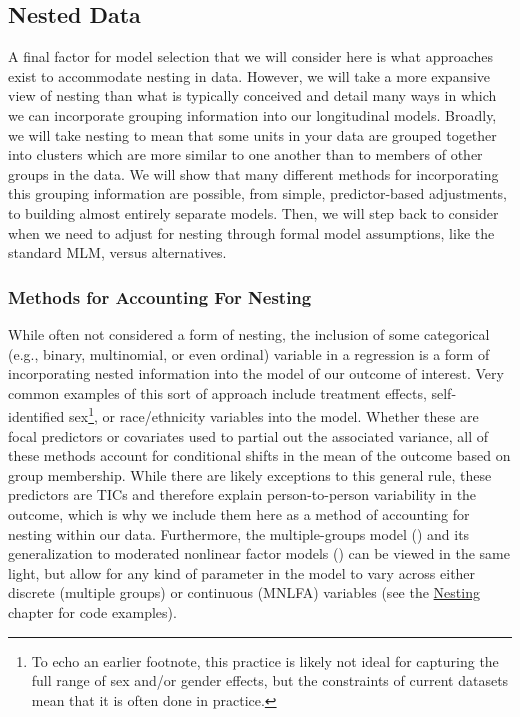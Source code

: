 \documentclass[11pt]{article}
\begin{document}
\subsection{Nested Data}
A final factor for model selection that we will consider here is what approaches exist to accommodate nesting in data. However, we will take a more expansive view of nesting than what is typically conceived and detail many ways in which we can incorporate grouping information into our longitudinal models. Broadly, we will take nesting to mean that some units in your data are grouped together into clusters which are more similar to one another than to members of other groups in the data. We will show that many different methods for incorporating this grouping information are possible, from simple, predictor-based adjustments, to building almost entirely separate models. Then, we will step back to consider when we need to adjust for nesting through formal model assumptions, like the standard MLM, versus alternatives.

\subsubsection{Methods for Accounting For Nesting}
While often not considered a form of nesting, the inclusion of some categorical (e.g., binary, multinomial, or even ordinal) variable in a regression is a form of incorporating nested information into the model of our outcome of interest. Very common examples of this sort of approach include treatment effects, self-identified sex\footnote{To echo an earlier footnote, this practice is likely not ideal for capturing the full range of sex and/or gender effects, but the constraints of current datasets mean that it is often done in practice.}, or race/ethnicity variables into the model. Whether these are focal predictors or covariates used to partial out the associated variance, all of these methods account for conditional shifts in the mean of the outcome based on group membership. While there are likely exceptions to this general rule, these predictors are TICs and therefore explain person-to-person variability in the outcome, which is why we include them here as a method of accounting for nesting within our data. Furthermore, the multiple-groups model (\cite{joreskog_simultaneous_1971}) and its generalization to moderated nonlinear factor models (\cite{bauer_more_2017}) can be viewed in the same light, but allow for any kind of parameter in the model to vary across either discrete (multiple groups) or continuous (MNLFA) variables (see the \href{https://e-m-mccormick.github.io/static/longitudinal-primer/06-nesting.html}{Nesting} chapter for code examples).
\end{document}
